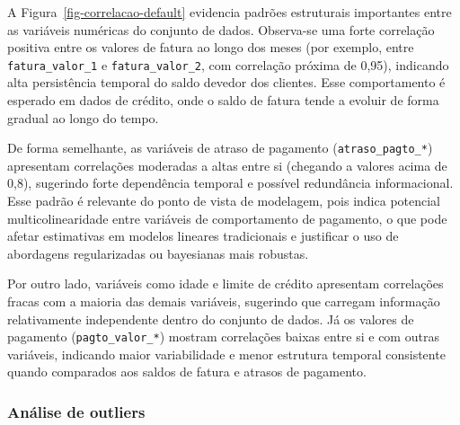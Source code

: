 \documentclass[
  brazilian,
  12pt,
  letterpaper,
  DIV=11,
  numbers=noendperiod]{scrartcl}
\begin{document}
A Figura~\ref{fig-correlacao-default} evidencia padrões estruturais
importantes entre as variáveis numéricas do conjunto de dados.
Observa-se uma forte correlação positiva entre os valores de fatura ao
longo dos meses (por exemplo, entre \texttt{fatura\_valor\_1} e
\texttt{fatura\_valor\_2}, com correlação próxima de 0,95), indicando
alta persistência temporal do saldo devedor dos clientes. Esse
comportamento é esperado em dados de crédito, onde o saldo de fatura
tende a evoluir de forma gradual ao longo do tempo.

De forma semelhante, as variáveis de atraso de pagamento
(\texttt{atraso\_pagto\_*}) apresentam correlações moderadas a altas
entre si (chegando a valores acima de 0,8), sugerindo forte dependência
temporal e possível redundância informacional. Esse padrão é relevante
do ponto de vista de modelagem, pois indica potencial multicolinearidade
entre variáveis de comportamento de pagamento, o que pode afetar
estimativas em modelos lineares tradicionais e justificar o uso de
abordagens regularizadas ou bayesianas mais robustas.

Por outro lado, variáveis como idade e limite de crédito apresentam
correlações fracas com a maioria das demais variáveis, sugerindo que
carregam informação relativamente independente dentro do conjunto de
dados. Já os valores de pagamento (\texttt{pagto\_valor\_*}) mostram
correlações baixas entre si e com outras variáveis, indicando maior
variabilidade e menor estrutura temporal consistente quando comparados
aos saldos de fatura e atrasos de pagamento.

\subsubsection{Análise de outliers}\label{anuxe1lise-de-outliers}
\end{document}
